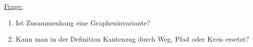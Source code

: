 \\\\
\underline{Frage:}
\begin{enumerate}
	\item Ist Zusammenhang eine Grapheninvariante?
	\item Kann man in der Definition Kantenzug durch Weg, Pfad oder Kreis ersetzt?
\end{enumerate}